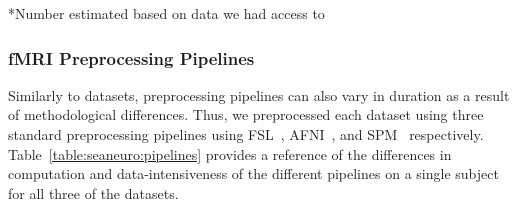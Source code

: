     \begin{table}[t]
      \small\centering
    \footnotesize{*Number estimated based on data we had access to}\\
    \caption{Dataset characteristics. Compressed size is listed, since all
    applications, except for SPM, processed compressed
    data}\label{table:sea-neuro:data}
    \end{table}
    
    
    
    \subsubsection{fMRI Preprocessing Pipelines}
    
    Similarly to datasets, preprocessing pipelines can also vary in duration as
    a result of methodological differences. Thus, we preprocessed each dataset
    using three standard preprocessing pipelines using FSL~\cite{fsl},
    AFNI~\cite{cox1996afni}, and SPM~\cite{spm} respectively.
    Table~\ref{table:seaneuro:pipelines} provides a reference of the differences
    in computation and data-intensiveness of the different pipelines on a single
    subject for all three of the datasets.
    
